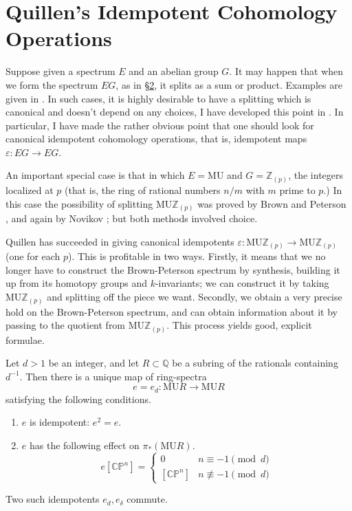 \documentclass[../main]{subfiles}
\begin{document}
\chapter{Quillen's Idempotent Cohomology Operations}
\label{sec:p2c15}

Suppose given a spectrum $E$ and an abelian group $G$. It may happen that when we form the spectrum $EG$, as in \hyperref[sec:p2c2]{\S 2}, it splits as a sum or product. Examples are given in \cite[Lecture 4]{adams3}. In such cases, it is highly desirable to have a splitting which is canonical and doesn't depend on any choices, I have developed this point in \cite[Lecture 4]{adams3}. In particular, I have made the rather obvious point that one should look for canonical idempotent cohomology operations, that is, idempotent maps
$\varepsilon:EG\longrightarrow EG$.

An important special case is that in which $E = \mathrm{MU}$ and $G=\mathbb{Z}_{(p)}$, the integers localized at $p$ (that is, the ring of rational numbers $n/m$ with $m$ prime to $p$.) In this case the possibility of splitting $\mathrm{MU}\mathbb{Z}_{(p)}$ was proved by Brown and Peterson \cite{brownpeterson}, and again by Novikov \cite{novikov}; but both methods involved choice.

Quillen has succeeded in giving canonical idempotents $\varepsilon:\mathrm{MU}\mathbb{Z}_{(p)}\longrightarrow \mathrm{MU}\mathbb{Z}_{(p)}$ (one for each $p$). This is profitable in two ways. Firstly, it means that we no longer have to construct the Brown-Peterson spectrum by synthesis, building it up from its homotopy groups and $k$-invariants; we can construct it by taking $\mathrm{MU}\mathbb{Z}_{(p)}$ and splitting off the piece we want. Secondly, we obtain a very precise hold on the Brown-Peterson spectrum, and can obtain information about it by passing to the quotient from $\mathrm{MU}\mathbb{Z}_{(p)}$. This process yields good, explicit formulae.

\begin{theorem}
\label{thm:p2c15.1}
Let $d>1$ be an integer, and let $R\subset\mathbb{Q}$ be a subring of the rationals containing $d^{-1}$. Then there is a unique map of ring-spectra \[e=e_d:\mathrm{MU}R\to \mathrm{MU}R\] satisfying the following conditions.
\begin{enumerate}
    \item $e$ is idempotent: $e^2=e$.
    \item $e$ has the following effect on $\pi_\ast(\mathrm{MU}R)$. 
    \[e[\mathbb{CP}^n]=
        \begin{cases}
            0 & n\equiv-1\pmod{d}\\
            [\mathbb{CP}^n] & n\not\equiv-1\pmod{d}
        \end{cases}\]
\end{enumerate}
Two such idempotents $e_d,e_\delta$ commute.
\end{theorem}
\end{document}
